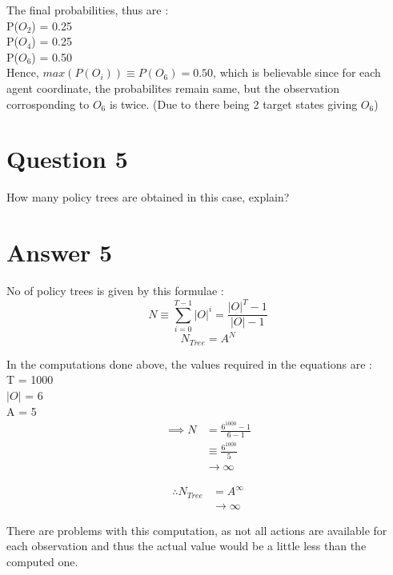 \documentclass[10pt,letterpaper]{article}
\begin{document}
The final probabilities, thus are :\\
    \hspace*{23pt} P($O_2$) = 0.25\\
    \hspace*{23pt} P($O_4$) = 0.25\\
    \hspace*{23pt} P($O_6$) = 0.50\\

\noindent Hence, $max(P(O_i)) \equiv P(O_6) = 0.50$, which is believable since 
for each agent coordinate, the probabilites remain same, but the observation 
corrosponding to $O_6$ is twice. (Due to there being 2 target states giving 
$O_6$) 

\section*{Question 5}
How many policy trees are obtained in this case, explain?
\section*{Answer 5}
No of policy trees is given by this formulae :\\
\begin{equation*}
    N \equiv \sum_{i = 0}^{T-1} |O|^i = \frac{|O|^T - 1}{|O| - 1}
\end{equation*}
\begin{equation*}
    N_{Tree} = A^N
\end{equation*}

\noindent In the computations done above, 
the values required in the equations are :\\
\hspace*{23pt} T = 1000\\
\hspace*{23pt} $|O|$ = 6\\
\hspace*{23pt} A = 5\\

\begin{align*}
    \implies N & = \frac{6^{1000} - 1}{6 - 1}\\
    & \equiv \frac{6^{1000}}{5}\\
    & \rightarrow \infty
\end{align*}

\begin{align*}
    \therefore N_{Tree} & = A^\infty\\
    & \rightarrow \infty
\end{align*}

\noindent There are problems with this computation, as not all actions are available 
for each observation and thus the actual value would be a little less than 
the computed one.
\end{document}

